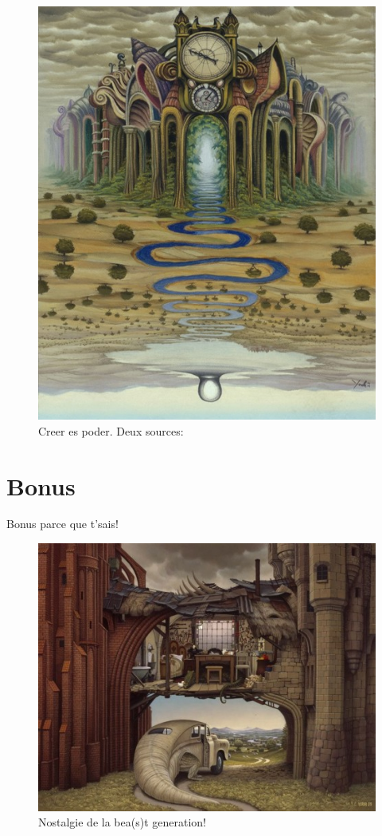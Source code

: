\documentclass[letterpaper,12pt]{article} %
\begin{document}
\begin{figure}[htb]
\begin{center}
\includegraphics[width=\columnwidth]{Images/image4.jpg}
\caption{\label{ann_nostalgia} Creer es poder. Deux sources: \cite{key1,keyPertinent} }
\end{center}
\end{figure}



\section{Bonus}
Bonus parce que t'sais! 



\begin{figure}[htb]
\begin{center}
\includegraphics[width=\columnwidth]{Images/image3.jpg}
\caption{\label{} Nostalgie de la bea(s)t generation! \cite{keyPertinent}}
\end{center}
\end{figure}
\end{document}
